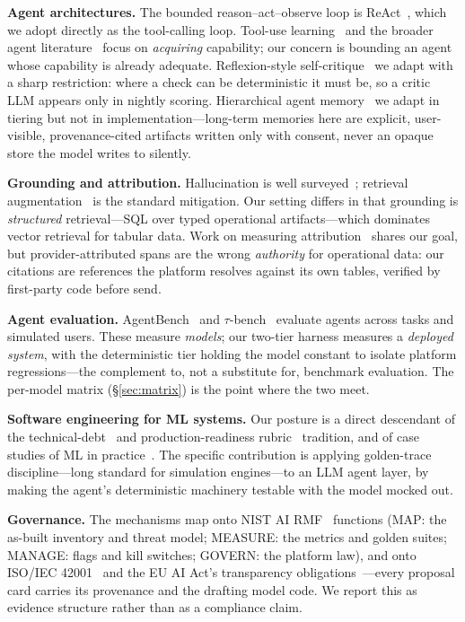 \documentclass[conference]{IEEEtran}
\begin{document}
\textbf{Agent architectures.} The bounded reason--act--observe loop is
ReAct~\cite{yao2023react}, which we adopt directly as the tool-calling loop.
Tool-use learning~\cite{schick2023toolformer} and the broader agent
literature~\cite{wang2024agentsurvey} focus on \emph{acquiring} capability; our
concern is bounding an agent whose capability is already adequate.
Reflexion-style self-critique~\cite{shinn2023reflexion} we adapt with a sharp
restriction: where a check can be deterministic it must be, so a critic LLM
appears only in nightly scoring. Hierarchical agent memory~\cite{packer2023memgpt}
we adapt in tiering but not in implementation---long-term memories here are
explicit, user-visible, provenance-cited artifacts written only with consent,
never an opaque store the model writes to silently.

\textbf{Grounding and attribution.} Hallucination is well
surveyed~\cite{ji2023hallucination}; retrieval augmentation~\cite{lewis2020rag} is
the standard mitigation. Our setting differs in that grounding is
\emph{structured} retrieval---SQL over typed operational artifacts---which
dominates vector retrieval for tabular data. Work on measuring
attribution~\cite{rashkin2021attributable} shares our goal, but provider-attributed
spans are the wrong \emph{authority} for operational data: our citations are
references the platform resolves against its own tables, verified by first-party
code before send.

\textbf{Agent evaluation.} AgentBench~\cite{liu2024agentbench} and
$\tau$-bench~\cite{yao2024taubench} evaluate agents across tasks and simulated
users. These measure \emph{models}; our two-tier harness measures a
\emph{deployed system}, with the deterministic tier holding the model constant to
isolate platform regressions---the complement to, not a substitute for, benchmark
evaluation. The per-model matrix (\S\ref{sec:matrix}) is the point where the two
meet.

\textbf{Software engineering for ML systems.} Our posture is a direct descendant
of the technical-debt~\cite{sculley2015debt} and production-readiness
rubric~\cite{breck2017mltest} tradition, and of case studies of ML in
practice~\cite{amershi2019se4ml}. The specific contribution is applying golden-trace
discipline---long standard for simulation engines---to an LLM agent layer, by
making the agent's deterministic machinery testable with the model mocked out.

\textbf{Governance.} The mechanisms map onto NIST AI RMF~\cite{nist2023airmf}
functions (MAP: the as-built inventory and threat model; MEASURE: the metrics and
golden suites; MANAGE: flags and kill switches; GOVERN: the platform law), and
onto ISO/IEC 42001~\cite{iso42001} and the EU AI Act's transparency
obligations~\cite{euaiact2024}---every proposal card carries its provenance and
the drafting model code. We report this as evidence structure rather than as a
compliance claim.
\end{document}

